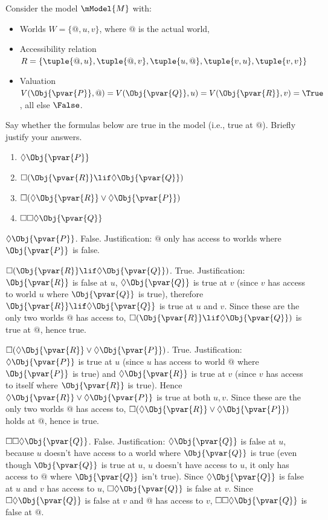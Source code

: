 \documentclass[../../../include/open-logic-section]{subfiles}
\begin{document}

\newpage
{}

\begin{prob}
 Consider the model $\mModel{M}$ with:
 \begin{itemize}
    \item Worlds $W=\{@,u,v\}$, where $@$ is the actual world,
    \item Accessibility relation 
    $R=\{\tuple{@,u},\tuple{@,v},\tuple{u,@},\tuple{v,u},\tuple{v,v}\}$
    \item Valuation $V(\Obj{\pvar{P}},@)=V(\Obj{\pvar{Q}},u)=V(\Obj{\pvar{R}},v)=\True$, all else $\False$.
 \end{itemize}
 Say whether the formulas below are true in the model (i.e., true at
    $@$). Briefly justify your answers.
    \begin{enumerate}
    \item $\Diamond \Obj{\pvar{P}}$
    \item $\Box(\Obj{\pvar{R}}\lif\Diamond \Obj{\pvar{Q}})$
    \item $\Box(\Diamond \Obj{\pvar{R}}\lor\Diamond \Obj{\pvar{P}})$
    \item $\Box\Box\Diamond \Obj{\pvar{Q}}$
    \end{enumerate}

\begin{ans}
\item $\Diamond \Obj{\pvar{P}}$. False. Justification: $@$ only has
access to worlds where $\Obj{\pvar{P}}$ is false.
\item $\Box(\Obj{\pvar{R}}\lif\Diamond \Obj{\pvar{Q}})$. True.
Justification: $\Obj{\pvar{R}}$ is false at $u$, $\Diamond
\Obj{\pvar{Q}}$ is true at $v$ (since $v$ has access to world $u$
where $\Obj{\pvar{Q}}$ is true), therefore $\Obj{\pvar{R}}\lif\Diamond
\Obj{\pvar{Q}}$ is true at $u$ and $v$. Since these are the only two
worlds $@$ has access to, $\Box(\Obj{\pvar{R}}\lif\Diamond
\Obj{\pvar{Q}})$ is true at $@$, hence true.
\item $\Box(\Diamond \Obj{\pvar{R}}\lor\Diamond \Obj{\pvar{P}})$. True. 
Justification: $\Diamond\Obj{\pvar{P}}$ is true at $u$ (since $u$ has access
to world $@$ where $\Obj{\pvar{P}}$ is true) and 
$\Diamond\Obj{\pvar{R}}$ is true at $v$ (since $v$ has access to 
itself where $\Obj{\pvar{R}}$ is true). Hence 
$\Diamond\Obj{\pvar{R}}\lor\Diamond\Obj{\pvar{P}}$ is true at both $u,v$.
Since these are the only two worlds $@$ has access to, 
$\Box(\Diamond\Obj{\pvar{R}}\lor\Diamond\Obj{\pvar{P}})$ holds at $@$, 
hence is true.
\item $\Box\Box\Diamond \Obj{\pvar{Q}}$. False. Justification:
$\Diamond\Obj{\pvar{Q}}$ is false at $u$, because $u$ doesn't 
have access to a world where $\Obj{\pvar{Q}}$ is true (even though 
$\Obj{\pvar{Q}}$ is true at $u$, $u$ doesn't have access to $u$, 
it only has access to $@$ where $\Obj{\pvar{Q}}$ isn't true). Since
$\Diamond\Obj{\pvar{Q}}$ is false at $u$ and $v$ has access to $u$, 
$\Box\Diamond\Obj{\pvar{Q}}$ is false at $v$. Since 
$\Box\Diamond\Obj{\pvar{Q}}$ is false at $v$ and $@$ has access to 
$v$, $\Box\Box\Diamond\Obj{\pvar{Q}}$ is false at $@$.


\end{ans}
\end{prob}
\end{document}
